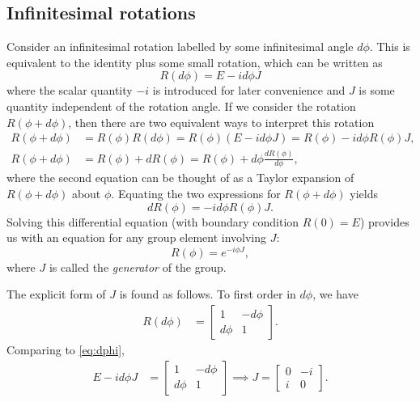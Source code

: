     \subsection{Infinitesimal rotations}\label{sec:inf_rot}
    Consider an infinitesimal rotation labelled by some infinitesimal angle $d\phi$. This is equivalent to the identity plus some small rotation, which can be written as
    \begin{equation}
        R(d\phi) = E - i d\phi J \label{eq:dphi}
    \end{equation}
    where the scalar quantity $-i$ is introduced for later convenience and $J$ is some quantity independent of the rotation angle. If we consider the rotation $R(\phi + d\phi)$, then there are two equivalent ways to interpret this rotation
    \begin{align}
        R(\phi + d\phi) &= R(\phi)R(d\phi) = R(\phi)(E - i d\phi J) = R(\phi) - i d\phi R(\phi)J, \\
        R(\phi + d\phi) &= R(\phi) + dR(\phi) = R(\phi) + d\phi\frac{dR(\phi)}{d\phi},
    \end{align}
    where the second equation can be thought of as a Taylor expansion of $R(\phi + d\phi)$ about $\phi$. Equating the two expressions for $R(\phi + d\phi)$ yields
    \begin{equation}
        dR(\phi) = -id\phi R(\phi)J.
    \end{equation}
    Solving this differential equation (with boundary condition $R(0)=E$) provides us with an equation for any group element involving $J$:
    \begin{equation}
        R(\phi) = e^{-i\phi J},
    \end{equation}
    where $J$ is called the \textit{generator} of the group.

    The explicit form of $J$ is found as follows. To first order in $d\phi$, we have
    \begin{align*}
        R(d\phi) &= \begin{bmatrix}
            1 & -d\phi \\
            d\phi & 1
        \end{bmatrix}.
    \end{align*}
    Comparing to \cref{eq:dphi},
    \begin{align*}
        E - i d\phi J &= \begin{bmatrix}
            1 & -d\phi \\
            d\phi & 1
        \end{bmatrix} \implies J = \begin{bmatrix}
            0 & -i \\
            i & 0
        \end{bmatrix}.
    \end{align*}
    

